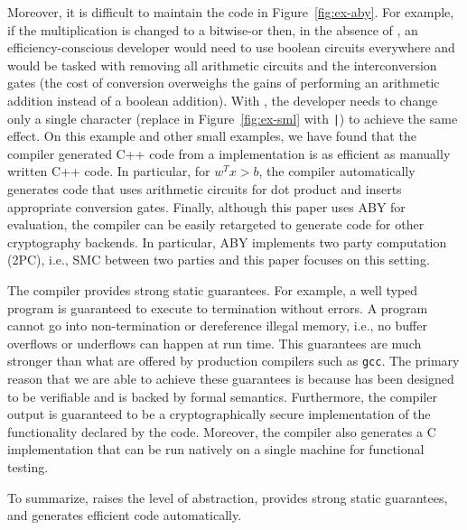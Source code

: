 Moreover, it is difficult to maintain the code in Figure~\ref{fig:ex-aby}.
For example, if the multiplication is changed to a bitwise-or then,
in the absence of \tool, an efficiency-conscious developer would need to  use boolean circuits everywhere and would be tasked with removing all arithmetic circuits and the interconversion gates (the cost of  conversion overweighs the gains of performing an arithmetic addition instead of a boolean addition). 
 With \tool, the developer needs to change only a single character (replace {\tt *} in Figure~\ref{fig:ex-sml} with {\tt |}) to achieve the same effect. 
On this example and other small examples, we have found that the compiler generated C++ code from a \tool implementation is as efficient as manually written C++ code. In particular, for $w^Tx>b$, the compiler automatically generates code that uses arithmetic circuits for dot product and inserts appropriate conversion gates. Finally, although this paper uses ABY for evaluation, the  compiler can be easily retargeted to generate code for other cryptography backends. In particular,
ABY implements two party computation (2PC), i.e., SMC between two parties
and this paper focuses on this setting.


The \tool compiler provides strong static guarantees. For example, a well typed
\tool program is guaranteed to execute to termination without errors. A \tool program cannot go into non-termination or dereference illegal memory, i.e., no buffer overflows or underflows can happen at run time. This guarantees are
much stronger than what are offered by production compilers such as {\tt gcc}.
The primary reason that we are able to achieve these guarantees is because
\tool has been designed to be verifiable and is backed by formal semantics. 
Furthermore, the compiler output is guaranteed to be a cryptographically secure
implementation of the functionality declared by the \tool code. 
Moreover, the \tool compiler also generates a C implementation that can be run natively on a single machine for functional testing. 

To summarize, \tool raises the level of abstraction, provides strong static guarantees, and generates efficient code automatically.
